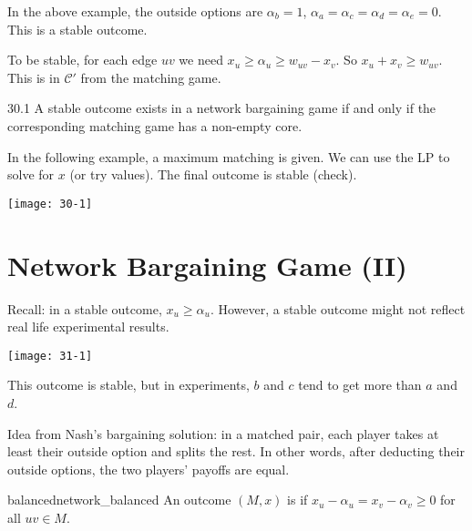 \documentclass[12pt,letterpaper]{report}
\begin{document}
\begin{ex}
  In the above example, the outside options are $\alpha_b = 1$,
  $\alpha_a = \alpha_c = \alpha_d = \alpha_e = 0$.
  This is a stable outcome.
\end{ex}

To be stable, for each edge $uv$ we need $x_u \geq \alpha_u \geq w_{uv} - x_v$.
So $x_u + x_v \geq w_{uv}$.
This is in $\mathcal{C}'$ from the matching game.

\begin{prop}{}{30.1}
  A stable outcome exists in a network bargaining game if and only if the corresponding matching
  game has a non-empty core.
\end{prop}

\begin{ex}
  In the following example, a maximum matching is given.
  We can use the LP to solve for $x$ (or try values).
  The final outcome is stable (check).

  \begin{center}
    \texttt{[image: 30-1]}
  \end{center}
\end{ex}

\section{Network Bargaining Game (II)}

Recall: in a stable outcome, $x_u \geq \alpha_u$.
However, a stable outcome might not reflect real life experimental results.

\begin{ex}
  \begin{center}
    \texttt{[image: 31-1]}
  \end{center}

  This outcome is stable, but in experiments, $b$ and $c$ tend to get more than $a$ and $d$.
\end{ex}

Idea from Nash's bargaining solution: in a matched pair, each player takes at least their outside
option and splits the rest.
In other words, after deducting their outside options, the two players' payoffs are equal.

\begin{defn}{balanced}{network_balanced}
  An outcome $(M, x)$ is  if $x_u - \alpha_u = x_v - \alpha_v \geq 0$ for all
  $uv \in M$.
\end{defn}
\end{document}
